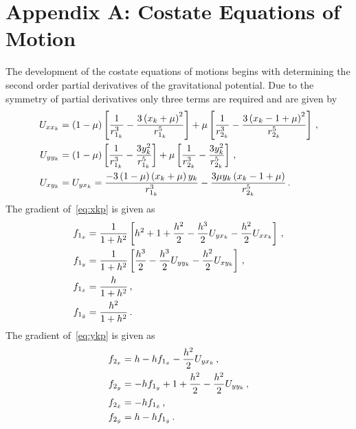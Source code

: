 \documentclass[smallcondensed]{svjour3}
\begin{document}
\appendix
\section*{Appendix A: Costate Equations of Motion}\label{sec:costate_appendix}
The development of the costate equations of motions begins with determining the second order partial derivatives of the gravitational potential. 
Due to the symmetry of partial derivatives only three terms are required and are given by
\begin{align}\label{eq:second_discrete_potential_grad}
        U_{xx_k} &= \left( 1-\mu \right) \left[ \frac{1}{r_{1_k}^3} - \frac{3 \left( x_k +\mu \right)^2}{r_{1_k}^5} \right] + \mu \left[ \frac{1}{r_{2_{k}}^3} - \frac{3 \left( x_k -1 + \mu \right)^2}{r_{2_{k}}^5} \right] \, ,\\
        U_{yy_{k}} &= \left( 1-\mu \right) \left[ \frac{1}{r_{1_k}^3} - \frac{3 y_{k}^2}{r_{1_k}^5} \right] + \mu \left[ \frac{1}{r_{2_{k}}^3} - \frac{3 y_{k}^2}{r_{2_{k}}^5} \right] \, ,\\
        U_{xy_{k}} &= U_{yx_k} =  \frac{-3 \left( 1-\mu \right) \left( x_k +\mu \right) y_{k}}{r_{1_k}^3} - \frac{3\mu y_{k}\left( x_k-1+\mu \right)}{r_{2_{k}}^5} \, .
\end{align}
The gradient of~\cref{eq:xkp} is given as
\begin{subequations}\label{eq:xkp_grad}
\begin{align}
        f_{1_x} &= \frac{1}{1+h^2} \left[ h^2 + 1 + \frac{h^2}{2} -\frac{h^3}{2} U_{yx_k} - \frac{h^2}{2}U_{xx_k} \right] \, ,\\
        f_{1_y} &= \frac{1}{1+h^2} \left[  \frac{h^3}{2} -\frac{h^3}{2} U_{yy_{k}} - \frac{h^2}{2}U_{xy_{k}} \right] \, ,\\
        f_{1_{\dot{x}}} &= \frac{h}{1+h^2} \, ,\\
        f_{1_{\dot{y}}} &= \frac{h^2}{1+h^2} \, .
\end{align}
\end{subequations}
The gradient of~\cref{eq:ykp} is given as
\begin{subequations}\label{eq:ykp_grad}
\begin{align}
        f_{2_x} &= h -h f_{1_x} - \frac{h^2}{2} U_{yx_k} \, , \\
        f_{2_y} &= -h f_{1_y} + 1 + \frac{h^2}{2} - \frac{h^2}{2} U_{yy_{k}} \, ,\\
        f_{2_{\dot{x}}} &= -h f_{1_{\dot{x}}} \, ,\\
        f_{2_{\dot{y}}} &= h - h f_{1_{\dot{y}}} \, .
\end{align}
\end{subequations}
\end{document}
